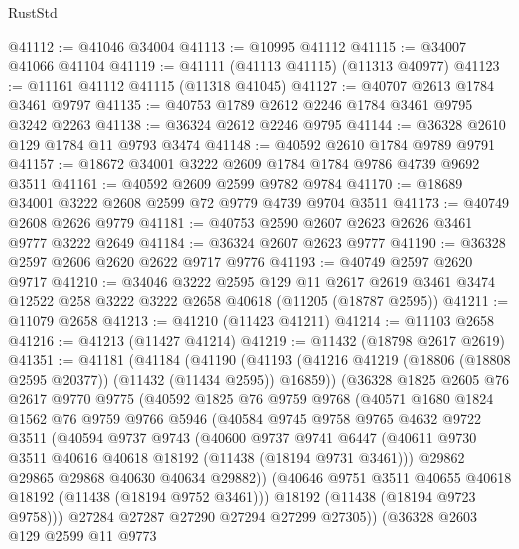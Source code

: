 \begin{lexlean}{RustStd}
\begin{coremodule}
@41112 := @41046 @34004
@41113 := @10995 @41112
@41115 := @34007 @41066 @41104
@41119 := @41111 (@41113 @41115) (@11313 @40977)
@41123 := @11161 @41112 @41115 (@11318 @41045)
@41127 := @40707 @2613 @1784 @3461 @9797
@41135 := @40753 @1789 @2612 @2246 @1784 @3461 @9795 @3242 @2263
@41138 := @36324 @2612 @2246 @9795
@41144 := @36328 @2610 @129 @1784 @11 @9793 @3474
@41148 := @40592 @2610 @1784 @9789 @9791
@41157 := @18672 @34001 @3222 @2609 @1784 @1784 @9786 @4739 @9692 @3511
@41161 := @40592 @2609 @2599 @9782 @9784
@41170 := @18689 @34001 @3222 @2608 @2599 @72 @9779 @4739 @9704 @3511
@41173 := @40749 @2608 @2626 @9779
@41181 := @40753 @2590 @2607 @2623 @2626 @3461 @9777 @3222 @2649
@41184 := @36324 @2607 @2623 @9777
@41190 := @36328 @2597 @2606 @2620 @2622 @9717 @9776
@41193 := @40749 @2597 @2620 @9717
@41210 := @34046
    @3222
    @2595
    @129
    @11
    @2617
    @2619
    @3461
    @3474
    @12522
    @258
    @3222
    @3222
    @2658
    @40618
    (@11205 (@18787 @2595))
@41211 := @11079 @2658
@41213 := @41210 (@11423 @41211)
@41214 := @11103 @2658
@41216 := @41213 (@11427 @41214)
@41219 := @11432 (@18798 @2617 @2619)
@41351 := @41181
    (@41184
      (@41190
        (@41193 (@41216 @41219 (@18806 (@18808 @2595 @20377)) (@11432 (@11434 @2595)) @16859))
        (@36328
          @1825
          @2605
          @76
          @2617
          @9770
          @9775
          (@40592
            @1825
            @76
            @9759
            @9768
            (@40571
              @1680
              @1824
              @1562
              @76
              @9759
              @9766
              @5946
              (@40584
                @9745
                @9758
                @9765
                @4632
                @9722
                @3511
                (@40594
                  @9737
                  @9743
                  (@40600
                    @9737
                    @9741
                    @6447
                    (@40611 @9730 @3511 @40616 @40618 @18192 (@11438 (@18194 @9731 @3461)))
                    @29862
                    @29865
                    @29868
                    @40630
                    @40634
                    @29882))
                (@40646 @9751 @3511 @40655 @40618 @18192 (@11438 (@18194 @9752 @3461)))
                @18192
                (@11438 (@18194 @9723 @9758)))
              @27284
              @27287
              @27290
              @27294
              @27299
              @27305))
          (@36328
            @2603
            @129
            @2599
            @11
            @9773

\end{coremodule}
\end{lexlean}
